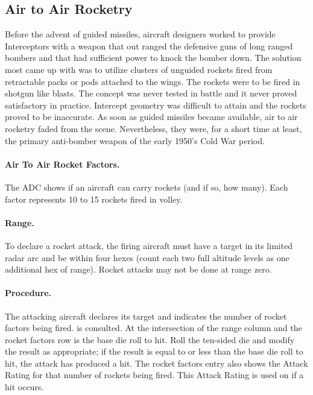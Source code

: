 \begin{advancedrules}

\section{Air to Air Rocketry}

\label{rule:air-to-air-rocket-combat}

Before the advent of guided missiles, aircraft designers worked to provide Interceptors with a weapon that out ranged the defensive guns of long ranged bombers and that had sufficient power to knock the bomber down. The solution most came up with was to utilize clusters of unguided rockets fired from retractable packs or pods attached to the wings. The rockets were to be fired in shotgun like blasts. The concept was never tested in battle and it never proved satisfactory in practice. Intercept geometry was difficult to attain and the rockets proved to be inaccurate. As soon as guided missiles became available, air to air rocketry faded from the scene. Nevertheless, they were, for a short time at least, the primary anti-bomber weapon of the early 1950's Cold War period.

\paragraph{Air To Air Rocket Factors.} The ADC shows if an aircraft can carry rockets (and if so, how many). Each factor represents 10 to 15 rockets fired in volley.

\paragraph{Range.} To declare a rocket attack, the firing aircraft must have a target in its limited radar arc and be within four hexes (count each two full altitude levels as one additional hex of range). Rocket attacks may not be done at range zero.

\paragraph{Procedure.} The attacking aircraft declares its target and indicates the number of rocket factors being fired.  is consulted. At the intersection of the range column and the rocket factors row is the base die roll to hit. Roll the ten-sided die and modify the result as appropriate; if the result is equal to or less than the base die roll to hit, the attack has produced a hit. The rocket factors entry also shows the Attack Rating for that number of rockets being fired. This Attack Rating is used on  if a hit occurs.


\end{advancedrules}
